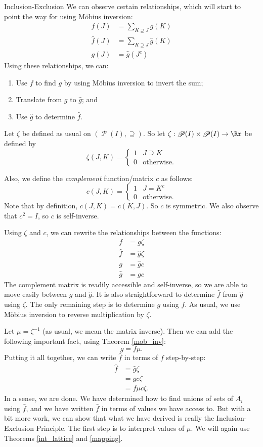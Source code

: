 \documentclass[12pt]{pom_thesis}
\DeclareMathOperator{\ps}{\mathscr{P}}
\begin{document}
\begin{chapter}{Inclusion-Exclusion}
We can observe certain relationships, which will start to point the way for using M\"obius inversion:
\begin{align*}
f(J) &= \sum_{K \supseteq J} g(K)\\
\hat{f}(J) &= \sum_{K \supseteq J} \hat{g}(K)\\
g(J) &= \hat{g}(J^c)
\end{align*}
Using these relationships, we can:
\begin{enumerate}
\item Use $f$ to find $g$ by using M\"obius inversion to invert the sum;
\item Translate from $g$ to $\hat{g}$; and
\item Use $\hat{g}$ to determine $\hat{f}$.
\end{enumerate}

Let $\zeta$ be defined as usual on $(\ps(I), \supseteq)$. So let $\zeta:\ps(I) \times \ps(I) \rightarrow \Rr$ be defined by
\[
\zeta(J,K) = \begin{cases} 1 & J \supseteq K \\ 0 & \text{otherwise}. \end{cases}
\]

Also, we define the \emph{complement} function/matrix $c$ as follows: 
\[
c(J,K) = \begin{cases} 1 & J = K^c \\ 0 & \text{otherwise}. \end{cases}
\]
Note that by definition, $c(J,K) = c(K,J)$. So $c$ is symmetric. We also observe that $c^2 = I$, so $c$ is self-inverse. 

Using $\zeta$ and $c$, we can rewrite the relationships between the functions:
\begin{align*}
f &= g\zeta\\
\hat{f} &= \hat{g}\zeta\\
g &= \hat{g}c\\
\hat{g} &= gc
\end{align*}
The complement matrix is readily accessible and self-inverse, so we are able to move easily between $g$ and $\hat{g}$. It is also straightforward to determine $\hat{f}$ from $\hat{g}$ using $\zeta$. The only remaining step is to determine $g$ using $f$. As usual, we use M\"obius inversion to reverse multiplication by $\zeta$.

Let $\mu = \zeta^{-1}$ (as usual, we mean the matrix inverse). Then we can add the following important fact, using Theorem \ref{mob_inv}:
\[
g = f\mu.
\]
Putting it all together, we can write $\hat{f}$ in terms of $f$ step-by-step:
\begin{align*}
\hat{f} &= \hat{g}\zeta\\
&= gc\zeta\\
&= f\mu c\zeta.
\end{align*}
In a sense, we are done. We have determined how to find unions of sets of $A_i$ using $\hat{f}$, and we have written $\hat{f}$ in terms of values we have access to. But with a bit more work, we can show that what we have derived is really the Inclusion-Exclusion Principle. The first step is to interpret values of $\mu$. We will again use Theorems \ref{int_lattice} and \ref{mapping}. 


\end{chapter}
\end{document}
